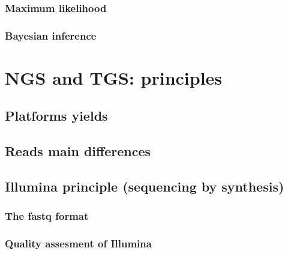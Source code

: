 \documentclass[
  letterpaper,
]{scrbook}
\begin{document}
\hypertarget{maximum-likelihood}{%
\subsection*{Maximum likelihood}\label{maximum-likelihood}}

\hypertarget{bayesian-inference}{%
\subsection*{Bayesian inference}\label{bayesian-inference}}

\hypertarget{ngs-and-tgs-principles}{%
\chapter{NGS and TGS: principles}\label{ngs-and-tgs-principles}}

\hypertarget{platforms-yields}{%
\section*{Platforms yields}\label{platforms-yields}}

\hypertarget{reads-main-differences}{%
\section*{Reads main differences}\label{reads-main-differences}}

\hypertarget{illumina-principle-sequencing-by-synthesis}{%
\section*{Illumina principle (sequencing by
synthesis)}\label{illumina-principle-sequencing-by-synthesis}}

\hypertarget{the-fastq-format}{%
\subsection*{The fastq format}\label{the-fastq-format}}

\hypertarget{quality-assesment-of-illumina}{%
\subsection*{Quality assesment of
Illumina}\label{quality-assesment-of-illumina}}
\end{document}
